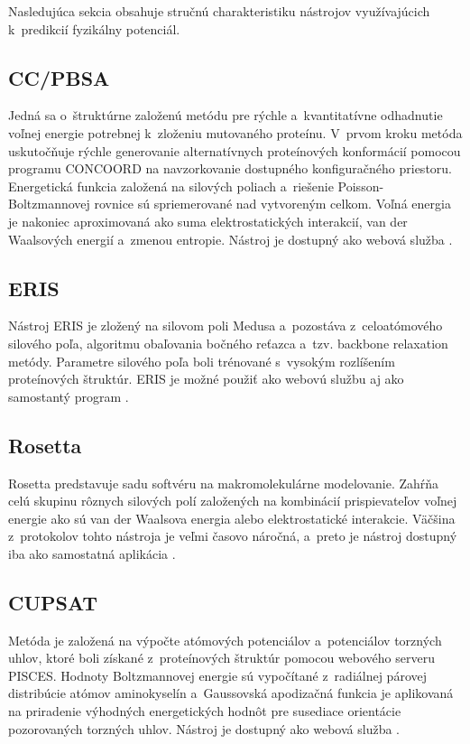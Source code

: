 Nasledujúca sekcia obsahuje stručnú charakteristiku nástrojov využívajúcich k~predikcií fyzikálny potenciál.

\subsection{CC/PBSA}

Jedná sa o~štruktúrne založenú metódu pre rýchle a~kvantitatívne odhadnutie voľnej energie potrebnej k~zloženiu mutovaného proteínu. V~prvom kroku metóda uskutočňuje rýchle generovanie alternatívnych proteínových konformácií pomocou programu CONCOORD na navzorkovanie dostupného konfiguračného priestoru. Energetická funkcia založená na silových poliach a~riešenie Poisson-Boltzmannovej rovnice sú spriemerované nad vytvoreným celkom. Voľná energia je nakoniec aproximovaná ako suma elektrostatických interakcií, van der Waalsových energií a~zmenou entropie. Nástroj je dostupný ako webová služba \cite{ccpbsa}. 

\subsection{ERIS}

Nástroj ERIS je zložený na silovom poli Medusa a~pozostáva z~celoatómového silového poľa, algoritmu obaľovania bočného reťazca a~tzv. backbone relaxation metódy. Parametre silového poľa boli trénované s~vysokým rozlíšením proteínových štruktúr. ERIS je možné použiť ako webovú službu aj ako samostantý program \cite{eris}.

\subsection{Rosetta}

Rosetta predstavuje sadu softvéru na makromolekulárne modelovanie. Zahŕňa celú skupinu rôznych silových polí založených na kombinácií prispievateľov voľnej energie ako sú van der Waalsova energia alebo elektrostatické interakcie. Väčšina z~protokolov tohto nástroja je veľmi časovo náročná, a~preto je nástroj dostupný iba ako samostatná aplikácia \cite{rosetta}.

\subsection{CUPSAT}

Metóda je založená na výpočte atómových potenciálov a~potenciálov torzných uhlov, ktoré boli získané z~proteínových štruktúr pomocou webového serveru PISCES. Hodnoty Boltzmannovej energie sú vypočítané z~radiálnej párovej distribúcie atómov aminokyselín a~Gaussovská apodizačná funkcia je aplikovaná na priradenie výhodných energetických hodnôt pre susediace orientácie pozorovaných torzných uhlov. Nástroj je dostupný ako webová služba \cite{cupsat}.  

